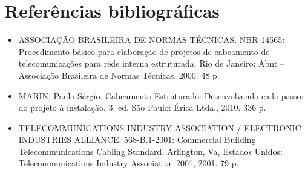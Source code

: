 \documentclass[	DIV=calc,%
							paper=a4,%
							fontsize=12pt,%
							onecolumn]{scrartcl}	 					%
\begin{document}
\section{Referências bibliográficas}
\begin{itemize}
\item ASSOCIAÇÃO BRASILEIRA DE NORMAS TÉCNICAS. NBR 14565: Procedimento básico para elaboração de projetos de cabeamento de telecomunicações para rede interna estruturada. Rio de Janeiro: Abnt – Associação Brasileira de Normas Técnicas, 2000. 48 p.

\item MARIN, Paulo Sérgio. Cabeamento Estruturado: Desenvolvendo cada passo: do projeto à instalação. 3. ed. São Paulo: Érica Ltda., 2010. 336 p.

\item TELECOMMUNICATIONS INDUSTRY ASSOCIATION / ELECTRONIC INDUSTRIES ALLIANCE. 568-B.1-2001: Commercial Building Telecommunications Cabling Standard. Arlington, Va, Estados Unidos: Telecommunications Industry Association 2001, 2001. 79 p.

\end{itemize}
\end{document}
